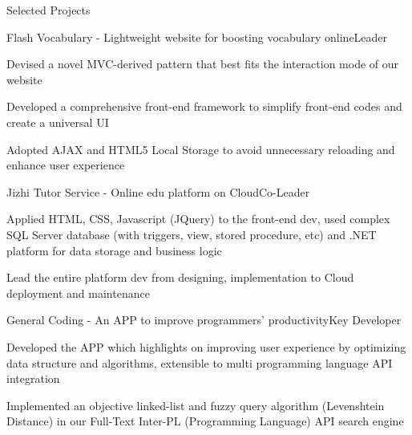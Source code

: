 \documentclass{resume} %
\begin{document}
\begin{rSection}{Selected Projects}
\begin{rSubsection}{Flash Vocabulary - Lightweight website for boosting vocabulary online}{Leader}{}{}
\item Devised a novel MVC-derived pattern that best fits the interaction mode of our website
\item Developed a comprehensive front-end framework to simplify front-end codes and create a universal UI
\item Adopted AJAX and HTML5 Local Storage to avoid unnecessary reloading and enhance user experience
\end{rSubsection}


\begin{rSubsection}{Jizhi Tutor Service - Online edu platform on Cloud}{Co-Leader}{}{}
\item Applied HTML, CSS, Javascript (JQuery) to the front-end dev, used complex SQL Server database (with triggers, view, stored procedure, etc) and .NET platform for data storage and business logic
\item Lead the entire platform dev from designing, implementation to Cloud deployment and maintenance
\end{rSubsection}


\begin{rSubsection}{General Coding - An APP to improve programmers' productivity}{Key Developer}{}{}
\item Developed the APP which highlights on improving user experience by optimizing data structure and algorithms, extensible to multi programming language API integration
\item Implemented an objective linked-list and fuzzy query algorithm (Levenshtein Distance) in our Full-Text
Inter-PL (Programming Language) API search engine
\end{rSubsection}


\end{rSection}

\end{document}
